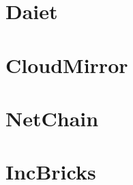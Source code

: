 \section{Daiet \texorpdfstring{\cite{daiet}}{}}

\newpage

\section{CloudMirror \texorpdfstring{\cite{cloudmirror}}{}}

\newpage

\section{NetChain \texorpdfstring{\cite{netchain}}{}}

\newpage

\section{IncBricks \texorpdfstring{\cite{incbricks}}{}}

